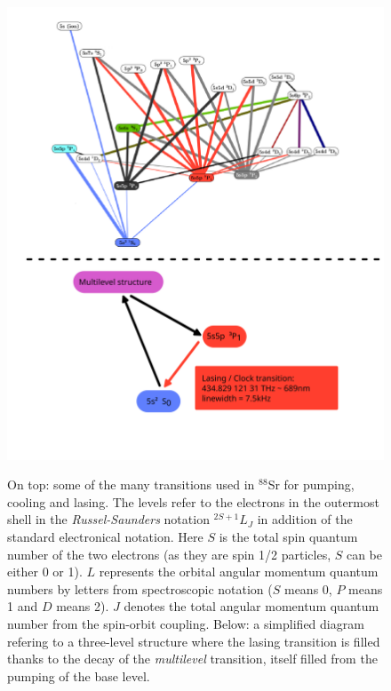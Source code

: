 \documentclass[10pt]{report}
\begin{document}
\begin{figure}[h!]
\caption{On top: some of the many transitions used in $^{88}$Sr for pumping, cooling and lasing. The levels refer to the electrons in the outermost shell in the \textit{Russel-Saunders} notation $^{2S+1}L_J$ in addition of the standard electronical notation. Here $S$ is the total spin quantum number of the two electrons (as they are spin 1/2 particles, $S$ can be either 0 or 1). $L$ represents the orbital angular momentum quantum numbers by letters from spectroscopic notation ($S$ means 0, $P$ means 1 and $D$ means 2). $J$ denotes the total angular momentum quantum number from the spin-orbit coupling. Below: a simplified diagram refering to a three-level structure where the lasing transition is filled thanks to the decay of the \textit{multilevel} transition, itself filled from the pumping of the base level.}
\centering
\includegraphics[width=\textwidth]{sr88}
\label{fig:sr88}
\end{figure}
\end{document}
